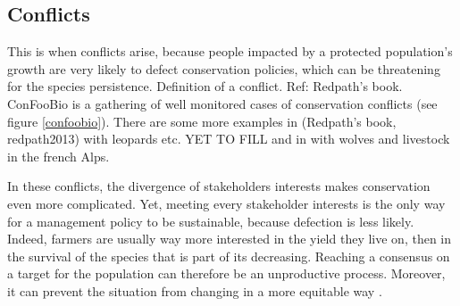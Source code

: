\documentclass[12pt,a4paper]{article}
\begin{document}
\subsection{Conflicts}

This is when conflicts arise, because people impacted by a protected population's growth are very likely to defect conservation policies, which can be threatening for the species persistence.
Definition of a conflict. Ref: Redpath's book.\\
ConFooBio is a gathering of well monitored cases of conservation conflicts (see figure \ref{confoobio}).
There are some more examples in (Redpath's book, redpath2013) with leopards etc. YET TO FILL
and in \cite{behr2017combining} with wolves and livestock in the french Alps.

In these conflicts, the divergence of stakeholders interests makes conservation even more complicated.
Yet, meeting every stakeholder interests is the only way for a management policy to be sustainable, because defection is less likely.
Indeed, farmers are usually way more interested in the yield they live on, then in the survival of the species that is part of its decreasing.
Reaching a consensus on a target for the population can therefore be an unproductive process.
Moreover, it can prevent the situation from changing in a more equitable way \citep{peterson2005conservation}.\\
%
\end{document}
